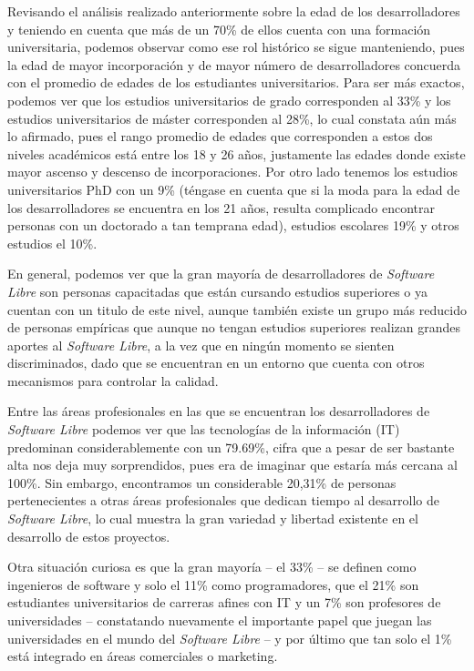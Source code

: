 Revisando el análisis realizado anteriormente sobre la edad de los desarrolladores y teniendo en cuenta que más de un 70\% de ellos cuenta con una formación universitaria, podemos observar como ese rol histórico se sigue manteniendo, pues la edad de mayor incorporación y de mayor número de desarrolladores concuerda con el promedio de edades de los estudiantes universitarios.  Para ser más exactos, podemos ver que los estudios universitarios de grado corresponden al 33\% y los estudios universitarios de máster corresponden al 28\%, lo cual constata aún más lo afirmado, pues el rango promedio de edades que corresponden a estos dos niveles académicos está entre los 18 y 26 años, justamente las edades donde existe mayor ascenso y descenso de incorporaciones. Por otro lado tenemos los estudios universitarios PhD con un 9\% (téngase en cuenta que si la moda para la edad de los desarrolladores se encuentra en los 21 años, resulta complicado encontrar personas con un doctorado a tan temprana edad), estudios escolares 19\% y otros estudios el 10\%.

En general, podemos ver que la gran mayoría de desarrolladores de \textit{Software Libre} son personas capacitadas que están cursando estudios superiores o ya cuentan con un titulo de este nivel, aunque también existe un grupo más reducido de personas empíricas que aunque no tengan estudios superiores realizan grandes aportes al \textit{Software Libre}, a la vez que en ningún momento se sienten discriminados, dado que se encuentran en un entorno que cuenta con otros mecanismos para controlar la calidad.

Entre las áreas profesionales en las que se encuentran los desarrolladores de \textit{Software Libre} podemos ver que las tecnologías de la información (IT) predominan considerablemente con un 79.69\%, cifra que a pesar de ser bastante alta nos deja muy sorprendidos, pues era de imaginar que estaría más cercana al 100\%.  Sin embargo,  encontramos un considerable 20,31\% de personas pertenecientes a otras áreas profesionales que dedican tiempo al desarrollo de \textit{Software Libre}, lo cual muestra la gran variedad y libertad existente en el desarrollo de estos proyectos. 

Otra situación curiosa es que la gran mayoría  – el 33\% –  se definen como ingenieros de software y solo el 11\% como programadores, que el 21\% son estudiantes universitarios de carreras afines con IT y un 7\% son profesores de universidades  –  constatando nuevamente el importante papel que juegan las universidades en el mundo del \textit{Software Libre} –  y por último que tan solo el 1\% está integrado en áreas comerciales o marketing.
 
